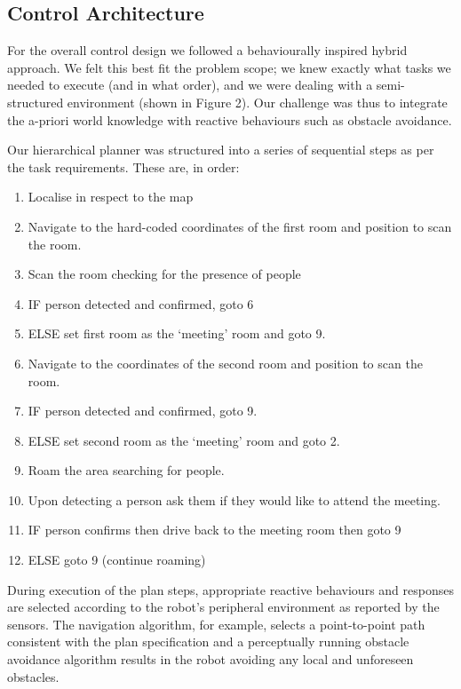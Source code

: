 \documentclass{article}
\begin{document}
	\subsection{Control Architecture}
	For the overall control design we followed a behaviourally inspired hybrid approach. We felt this best fit the problem scope; we knew exactly what tasks we needed to execute (and in what order), and we were dealing with a semi-structured environment (shown in Figure 2). Our challenge was thus to integrate the a-priori world knowledge with reactive behaviours such as obstacle avoidance. 

Our hierarchical planner was structured into a series of sequential steps as per the task requirements. These are, in order:
\begin{enumerate}[topsep=0pt,itemsep=-1ex,partopsep=1ex,parsep=1ex]
\item Localise in respect to the map
\item  Navigate to the hard-coded coordinates of the first room and position to scan the room.
\item  Scan the room checking for the presence of people
\item  IF person detected and confirmed, goto 6
\item  ELSE set first room as the ‘meeting’ room and goto 9.
\item  Navigate to the coordinates of the second room and position to scan the room.
\item  IF person detected and confirmed, goto 9.
\item  ELSE set second room as the ‘meeting’ room and goto 2.
\item  Roam the area searching for people.
\item  Upon detecting a person ask them if they would like to attend the meeting.
\item  IF person confirms then drive back to the meeting room then goto 9
\item  ELSE goto 9 (continue roaming)
\end{enumerate}

During execution of the plan steps, appropriate reactive behaviours and responses are selected according to the robot’s peripheral environment as reported by the sensors. The navigation algorithm, for example, selects a point-to-point path consistent with the plan specification and a perceptually running obstacle avoidance algorithm results in the robot avoiding any local and unforeseen obstacles.
	
\end{document}
